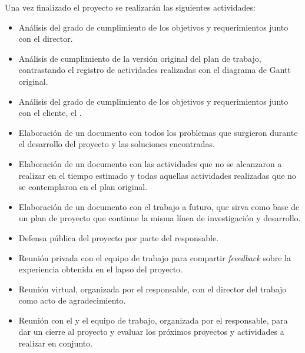 \documentclass[
11pt, %
codirector, %
]{charter}
\begin{document}
Una vez finalizado el proyecto se realizarán las siguientes actividades:
\begin{itemize}
	\item Análisis del grado de cumplimiento de los objetivos y requerimientos junto con el director.
	\item Análisis de cumplimiento de la versión original del plan de trabajo, contrastando el registro de actividades realizadas con el diagrama de Gantt original.
	\item Análisis del grado de cumplimiento de los objetivos y requerimientos junto con el cliente, el \clientename{}.
	\item Elaboración de un documento con todos los problemas que surgieron durante el desarrollo del proyecto y las soluciones encontradas.
	\item Elaboración de un documento con las actividades que no se alcanzaron a realizar en el tiempo estimado y todas aquellas actividades realizadas que no se contemplaron en el plan original.
	\item Elaboración de un documento con el trabajo a futuro, que sirva como base de un plan de proyecto que continue la misma línea de investigación y desarrollo.
	\item Defensa pública del proyecto por parte del responsable.
	\item Reunión privada con el equipo de trabajo para compartir \textit{feeedback} sobre la experiencia obtenida en el lapso del proyecto.
	\item Reunión virtual, organizada por el responsable, con el director del trabajo como acto de agradecimiento.
	\item Reunión con el \clientename{} y el equipo de trabajo, organizada por el responsable, para dar un cierre al proyecto y evaluar los próximos proyectos y actividades a realizar en conjunto.
\end{itemize}
\end{document}
